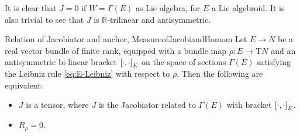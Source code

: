 \begin{remark}
\leavevmode\newline
It is clear that $J = 0$ if $W = \Gamma(E)$ as Lie algebra, for $E$ a Lie algebroid. It is also trivial to see that $J$ is $\mathbb{R}$-trilinear and antisymmetric.
\end{remark}

%

\begin{propositions}{Relation of Jacobiator and anchor, \cite[page 68]{Homomrho}}{MeasureofJacobiandHomom}
Let $E \to N$ be a real vector bundle of finite rank, equipped with a bundle map $\rho: E \to \mathrm{T}N$ and an antisymmetric bi-linear bracket $\mleft[ \cdot, \cdot \mright]_E$ on the space of sections $\Gamma(E)$ satisfying the Leibniz rule \eqref{eq:E-Leibniz} with respect to $\rho$. Then the following are equivalent:
\begin{itemize}
	\item $J$ is a tensor, where $J$ is the Jacobiator related to $\Gamma(E)$ with bracket $\mleft[ \cdot, \cdot\mright]_E$.
	\item $R_\rho = 0$.
\end{itemize}
\end{propositions}

